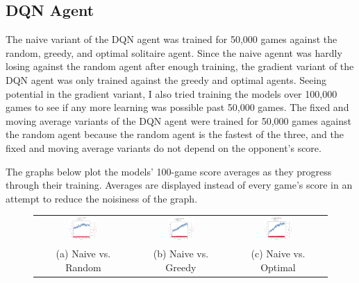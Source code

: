 \documentclass[12pt]{article}
\begin{document}
\subsection{DQN Agent}
The naive variant of the DQN agent was trained for 50,000 games against the random, greedy, and optimal solitaire agent. Since the naive agennt was hardly losing against the random agent after enough training, the gradient variant of the DQN agent was only trained against the greedy and optimal agents. Seeing potential in the gradient variant, I also tried training the models over 100,000 games to see if any more learning was possible past 50,000 games. The fixed and moving average variants of the DQN agent were trained for 50,000 games against the random agent because the random agent is the fastest of the three, and the fixed and moving average variants do not depend on the opponent's score.

The graphs below plot the models' 100-game score averages as they progress through their training. Averages are displayed instead of every game's score in an attempt to reduce the noisiness of the graph.

\begin{figure}[H]
    \begin{tabular}{ccc}
        \includegraphics[width=0.3\textwidth]{naive_random} & 
        \includegraphics[width=0.3\textwidth]{naive_greedy} & 
        \includegraphics[width=0.3\textwidth]{naive_optimal} \\
        (a) Naive vs. Random &
        (b) Naive vs. Greedy &
        (c) Naive vs. Optimal
    \end{tabular}
\end{figure}
\end{document}
